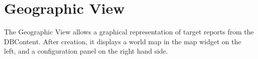 \chapter{Geographic View}
\label{sec:geo_view}

The Geographic View allows a graphical representation of target reports from the DBContent. After creation, it displays a world map in the map widget on the left, and a configuration panel on the right hand side.

















